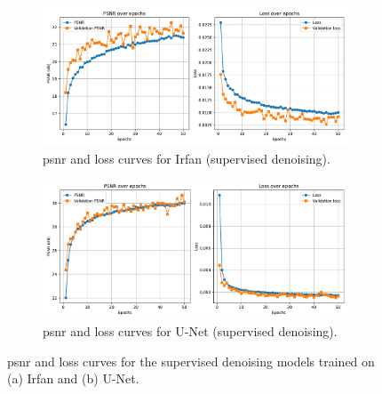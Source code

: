 \begin{figure}[p]
    \centering
    \begin{subfigure}{\textwidth}
        \centering
        \includegraphics[width=\textwidth]{img/ch6/supervised/psnr_loss_irfan.pdf}
        \caption{\acrshort{psnr} and loss curves for Irfan (supervised denoising).}
    \end{subfigure}
    
    \vspace{1cm}
    
    \begin{subfigure}{\textwidth}
        \centering
        \includegraphics[width=\textwidth]{img/ch6/supervised/psnr_loss_unet.pdf}
        \caption{\acrshort{psnr} and loss curves for U-Net (supervised denoising).}
    \end{subfigure}
    \caption{\acrshort{psnr} and loss curves for the supervised denoising models trained on (a) Irfan and (b) U-Net.}
    \label{fig:supervised-denoising-curves}
\end{figure}

